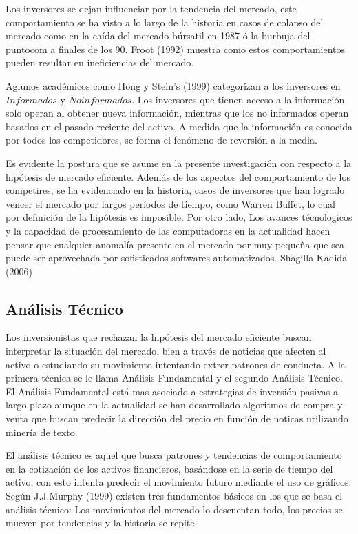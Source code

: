 \documentclass[a4paper,12pt]{Latex/Classes/PhDthesisPSnPDF}
\begin{document}
Los inversores se dejan influenciar por la tendencia del mercado, este comportamiento se ha visto a lo largo de la historia en casos de colapso del mercado como en la caída del mercado búrsatil en 1987 ó la burbuja del puntocom a finales de los 90. Froot (1992) muestra como estos comportamientos pueden resultar en ineficiencias del mercado.

Aglunos académicos como Hong y Stein's (1999) categorizan a los inversores en $Informados$ y $No informados$. Los inversores que tienen acceso a la información solo operan al obtener nueva información, mientras que los no informados operan basados en el pasado reciente del activo. A medida que la información es conocida por todos los competidores, se forma el fenómeno de reversión a la media.

Es evidente la postura que se asume en la presente investigación con respecto a la hipótesis de mercado eficiente. Además de los aspectos del comportamiento de los competires, se ha evidenciado en la historia, casos de inversores que han logrado vencer el mercado por largos períodos de tiempo, como Warren Buffet, lo cual por definición de la hipótesis es imposible. Por otro lado, Los avances técnologicos y la capacidad de procesamiento de las computadoras en la actualidad hacen pensar que cualquier anomalía presente en el mercado por muy pequeña que sea puede ser aprovechada por sofisticados softwares automatizados. Shagilla Kadida (2006)

\subsection{Análisis Técnico}

Los inversionistas que rechazan la hipótesis del mercado eficiente buscan interpretar la situación del mercado, bien a través de noticias que afecten al activo o estudiando su movimiento intentando extrer patrones de conducta. A la primera técnica se le llama Análisis Fundamental y el segundo Análisis Técnico. El Análisis Fundamental está mas asociado a estrategias de inversión pasivas a largo plazo aunque en la actualidad se han desarrollado algoritmos de compra y venta que buscan predecir la dirección del precio en función de noticas utilizando minería de texto.

El análisis técnico es aquel que busca patrones y tendencias de comportamiento en la cotización de los activos financieros, basándose en la serie de tiempo del activo, con esto intenta predecir el movimiento futuro mediante el uso de gráficos. Según J.J.Murphy (1999) existen tres fundamentos básicos en los que se basa el análisis técnico: Los movimientos del mercado lo descuentan  todo, los precios se mueven por tendencias y la historia se repite.
\end{document}
